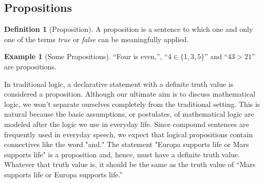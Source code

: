 \documentclass[10pt,]{book}
\theoremstyle{plain}
\theoremstyle{definition}
\newtheorem{definition}[theorem]{Definition}
\theoremstyle{definition}
\theoremstyle{definition}
\newtheorem{example}[theorem]{Example}
\theoremstyle{definition}
\begin{document}
\subsection[Propositions]{Propositions}\label{ss-propositions}
\begin{definition}[Proposition]\label{def-proposition}
 A proposition is a sentence to which one and only one of the terms \emph{true} or \emph{false} can be meaningfully applied.%
\end{definition}
\begin{example}[Some Propositions]\label{some-propositions}
``Four is even,'', ``\(4 \in  \{1,3, 5\}\)'' and ``\(43 > 21\)'' are propositions.%
\end{example}
In traditional logic, a declarative statement with a definite truth value is considered a proposition. Although our ultimate aim is to discuss mathematical logic, we won't separate ourselves completely from the traditional setting. This is natural because the basic assumptions, or postulates, of mathematical logic are modeled after the logic we use in everyday life. Since compound sentences are frequently used in everyday speech, we expect that logical propositions contain connectives like the word "and." The statement "Europa supports life or Mars supports life" is a proposition and, hence,
must have a definite truth value. Whatever that truth value is, it should be the same as the truth value of ``Mars supports life or Europa supports life.''%
\typeout{************************************************}
\typeout{************************************************}
\end{document}
